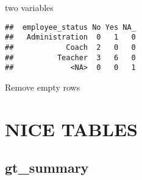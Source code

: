 \documentclass[
]{article}
\begin{document}
two variables

\begin{verbatim}
##  employee_status No Yes NA_
##   Administration  0   1   0
##            Coach  2   0   0
##          Teacher  3   6   0
##             <NA>  0   0   1
\end{verbatim}

Remove empty rows

\hypertarget{nice-tables}{%
\section{NICE TABLES}\label{nice-tables}}

\hypertarget{gt_summary}{%
\subsection{gt\_summary}\label{gt_summary}}
\end{document}
